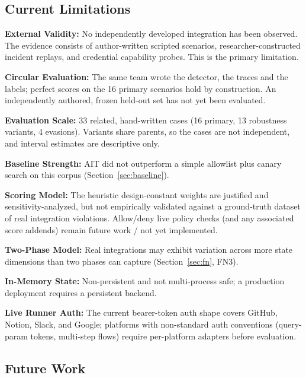 \documentclass[conference]{IEEEtran}
\begin{document}
\subsection{Current Limitations}

\textbf{External Validity:} No independently developed integration has
been observed. The evidence consists of author-written scripted
scenarios, researcher-constructed incident replays, and credential
capability probes. This is the primary limitation.

\textbf{Circular Evaluation:} The same team wrote the detector, the
traces and the labels; perfect scores on the 16 primary scenarios hold
by construction. An independently authored, frozen held-out set has not
yet been evaluated.

\textbf{Evaluation Scale:} 33 related, hand-written cases (16 primary,
13 robustness variants, 4 evasions). Variants share parents, so the cases
are not independent, and interval estimates are descriptive only.

\textbf{Baseline Strength:} AIT did not outperform a simple allowlist
plus canary search on this corpus (Section~\ref{sec:baseline}).

\textbf{Scoring Model:} The heuristic design-constant weights are justified and
sensitivity-analyzed, but not empirically validated against a
ground-truth dataset of real integration violations. Allow/deny live
policy checks (and any associated score addends) remain future work /
not yet implemented.

\textbf{Two-Phase Model:} Real integrations may exhibit variation
across more state dimensions than two phases can capture
(Section~\ref{sec:fn}, FN3).

\textbf{In-Memory State:} Non-persistent and not multi-process safe;
a production deployment requires a persistent backend.

\textbf{Live Runner Auth:} The current bearer-token auth shape covers
GitHub, Notion, Slack, and Google; platforms with non-standard auth
conventions (query-param tokens, multi-step flows) require per-platform
adapters before evaluation.

\subsection{Future Work}
\label{sec:future}
\end{document}
